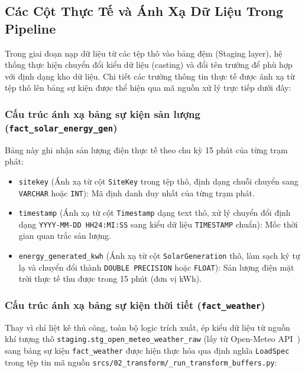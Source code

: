 \documentclass[12pt, a4paper]{report}
\begin{document}
\subsection{Các Cột Thực Tế và Ánh Xạ Dữ Liệu Trong Pipeline}
Trong giai đoạn nạp dữ liệu từ các tệp thô vào bảng đệm (Staging layer), hệ thống thực hiện chuyển đổi kiểu dữ liệu (casting) và đổi tên trường để phù hợp với định dạng kho dữ liệu. Chi tiết các trường thông tin thực tế được ánh xạ từ tệp thô lên bảng sự kiện được thể hiện qua mã nguồn xử lý trực tiếp dưới đây:

\subsubsection{Cấu trúc ánh xạ bảng sự kiện sản lượng (\texttt{fact\_solar\_energy\_gen})}
Bảng này ghi nhận sản lượng điện thực tế theo chu kỳ 15 phút của từng trạm phát:
\begin{itemize}
    \item \texttt{sitekey} (Ánh xạ từ cột \texttt{SiteKey} trong tệp thô, định dạng chuỗi chuyển sang \texttt{VARCHAR} hoặc \texttt{INT}): Mã định danh duy nhất của từng trạm phát.
    \item \texttt{timestamp} (Ánh xạ từ cột \texttt{Timestamp} dạng text thô, xử lý chuyển đổi định dạng \texttt{YYYY-MM-DD HH24:MI:SS} sang kiểu dữ liệu \texttt{TIMESTAMP} chuẩn): Mốc thời gian quan trắc sản lượng.
    \item \texttt{energy\_generated\_kwh} (Ánh xạ từ cột \texttt{SolarGeneration} thô, làm sạch ký tự lạ và chuyển đổi thành \texttt{DOUBLE PRECISION} hoặc \texttt{FLOAT}): Sản lượng điện mặt trời thực tế thu được trong 15 phút (đơn vị kWh).
\end{itemize}

\subsubsection{Cấu trúc ánh xạ bảng sự kiện thời tiết (\texttt{fact\_weather})}
Thay vì chỉ liệt kê thủ công, toàn bộ logic trích xuất, ép kiểu dữ liệu từ nguồn khí tượng thô \texttt{staging.stg\_open\_meteo\_weather\_raw} (lấy từ Open-Meteo API~\cite{openmeteo2023}) sang bảng sự kiện \texttt{fact\_weather} được hiện thực hóa qua định nghĩa \texttt{LoadSpec} trong tệp tin mã nguồn \texttt{srcs/02\_transform/\_run\_transform\_buffers.py}:
\end{document}
